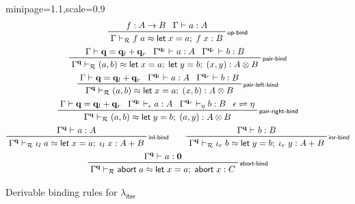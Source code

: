 \documentclass[acmsmall,screen,anonymous,review]{acmart}
\newcommand{\mc}[1]{\ensuremath{\mathcal{#1}}}
\newcommand{\mb}[1]{\ensuremath{\mathbf{#1}}}
\newcommand{\ms}[1]{\ensuremath{\mathsf{#1}}}
\newcommand{\linl}[1]{\iota_l\;{#1}}
\newcommand{\linr}[1]{\iota_r\;{#1}}
\newcommand{\labort}[1]{\ms{abort}\;{#1}}
\newcommand{\letexpr}[3]{\ensuremath{\ms{let}\;#1 = #2;\;#3}}
\newcommand{\qsp}[4]{#1 \vdash #2 = #3 + #4}
\newcommand{\rle}[1]{{\scriptsize\textsf{#1}}}
\newcommand{\hasty}[4]{#1 \vdash_{#2} #3: {#4}}
\newcommand{\teqv}{\approx}
\newcommand{\tmeq}[5]{#1 \vdash_{#2} #3 \teqv #4 : {#5}}
\newcommand{\subiterexp}{\texorpdfstring{\(\lambda_{\ms{iter}}\)}{lambda-iter}}
\newcommand{\slides}{\rightleftharpoons}
\begin{document}
\begin{figure}
  \begin{adjustbox}{minipage=1.1\textwidth,scale=0.9}
  \begin{gather*}
    \prftree[r]{\rle{op-bind}}
      {f : A \to B}
      {\hasty{\Gamma}{}{a}{A}}
      {\tmeq{\Gamma}{\mc{R}}{f\;a}{\letexpr{x}{a}{f\;x}}{B}} 
      \\
    \prftree[r]{\rle{pair-bind}}
      {\qsp{\Gamma}{\mb{q}}{\mb{q}_l}{\mb{q}_r}}
      {\hasty{\Gamma^{\mb{q}_l}}{}{a}{A}}
      {\hasty{\Gamma^{\mb{q}_r}}{}{b}{B}}
      {\tmeq{\Gamma^{\mb{q}}}{\mc{R}}{(a, b)}{\letexpr{x}{a}{\letexpr{y}{b}{(x, y)}}}{A \otimes B}} 
      \\
    \prftree[r]{\rle{pair-left-bind}}
      {\qsp{\Gamma}{\mb{q}}{\mb{q}_l}{\mb{q}_r}}
      {\hasty{\Gamma^{\mb{q}_l}}{}{a}{A}}
      {\hasty{\Gamma^{\mb{q}_r}}{}{b}{B}}
      {\tmeq{\Gamma^{\mb{q}}}{\mc{R}}{(a, b)}{\letexpr{x}{a}{(x, b)}}{A \otimes B}} 
      \\
    \prftree[r]{\rle{pair-right-bind}}
      {\qsp{\Gamma}{\mb{q}}{\mb{q}_l}{\mb{q}_r}}
      {\hasty{\Gamma^{\mb{q}_l}}{\epsilon}{a}{A}}
      {\hasty{\Gamma^{\mb{q}_r}}{\eta}{b}{B}}
      {\epsilon \slides \eta}
      {\tmeq{\Gamma^{\mb{q}}}{\mc{R}}{(a, b)}{\letexpr{y}{b}{(a, y)}}{A \otimes B}} 
      \\
    \prftree[r]{\rle{inl-bind}}
      {\hasty{\Gamma^{\mb{q}}}{}{a}{A}}
      {\tmeq{\Gamma^{\mb{q}}}{\mc{R}}{\linl{a}}{\letexpr{x}{a}{\linl{x}}}{A + B}} \qquad
    \prftree[r]{\rle{inr-bind}}
      {\hasty{\Gamma^{\mb{q}}}{}{b}{B}}
      {\tmeq{\Gamma^{\mb{q}}}{\mc{R}}
      {\linr{b}}{\letexpr{y}{b}{\linr{y}}}{A + B}} 
      \\
    \prftree[r]{\rle{abort-bind}}
      {\hasty{\Gamma^{\mb{q}}}{}{a}{\mb{0}}}
      {\tmeq{\Gamma^{\mb{q}}}{\mc{R}}{\labort{a}}{\letexpr{x}{a}{\labort{x}}}{C}} 
      \\
  \end{gather*}
  \end{adjustbox}
  \caption{Derivable binding rules for \subiterexp{}}
  \Description{}
  \label{fig:derivable-binding}
\end{figure}


\end{document}
